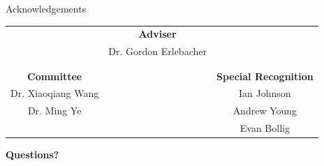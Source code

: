 \documentclass[red]{beamer}
\begin{document}
\begin{frame}{Acknowledgements}
	\begin{table}[htdp]
	\begin{center}
	\begin{tabular}{ccc}
	 & \textbf{Adviser} &\\
	 & Dr. Gordon Erlebacher &\\ 
	& &  \\
	& &  \\ 
	\textbf{Committee} 		&&  \textbf{Special Recognition}\\ 
	Dr. Xiaoqiang Wang 	&&  Ian Johnson\\ 
	Dr. Ming Ye 			&&  Andrew Young\\ 
	 					&&   Evan Bollig \\
	\end{tabular} 
	\end{center}
	\end{table}
\end{frame}

\begin{frame}
	\begin{center}
	\textbf{Questions?}
	\end{center}
\end{frame}
\end{document}
